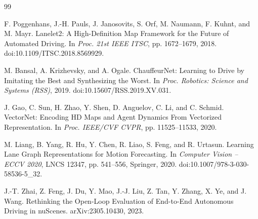 \documentclass[
  english,
  10pt,
]{article}
\begin{document}
\begin{thebibliography}{99}
\begin{otherlanguage}{english}
\end{otherlanguage}

\begin{otherlanguage}{english}

F. Poggenhans, J.-H. Pauls, J. Janosovits, S. Orf, M. Naumann, F. Kuhnt,
and M. Mayr. Lanelet2: A High-Definition Map Framework for the Future of
Automated Driving. In \emph{Proc. 21st IEEE ITSC}, pp. 1672--1679, 2018.
doi:10.1109/ITSC.2018.8569929.

\end{otherlanguage}

\begin{otherlanguage}{english}

M. Bansal, A. Krizhevsky, and A. Ogale. ChauffeurNet: Learning to Drive
by Imitating the Best and Synthesizing the Worst. In \emph{Proc.
Robotics: Science and Systems (RSS)}, 2019.
doi:10.15607/RSS.2019.XV.031.

\end{otherlanguage}

\begin{otherlanguage}{english}

J. Gao, C. Sun, H. Zhao, Y. Shen, D. Anguelov, C. Li, and C. Schmid.
VectorNet: Encoding HD Maps and Agent Dynamics From Vectorized
Representation. In \emph{Proc. IEEE/CVF CVPR}, pp. 11525--11533, 2020.

\end{otherlanguage}

\begin{otherlanguage}{english}

M. Liang, B. Yang, R. Hu, Y. Chen, R. Liao, S. Feng, and R. Urtasun.
Learning Lane Graph Representations for Motion Forecasting. In
\emph{Computer Vision -- ECCV 2020}, LNCS 12347, pp. 541--556, Springer,
2020. doi:10.1007/978-3-030-58536-5\_32.

\end{otherlanguage}

\begin{otherlanguage}{english}

J.-T. Zhai, Z. Feng, J. Du, Y. Mao, J.-J. Liu, Z. Tan, Y. Zhang, X. Ye,
and J. Wang. Rethinking the Open-Loop Evaluation of End-to-End
Autonomous Driving in nuScenes. arXiv:2305.10430, 2023.

\end{otherlanguage}

\begin{otherlanguage}{english}


\end{otherlanguage}
\end{thebibliography}
\end{document}
